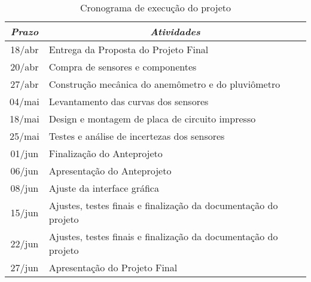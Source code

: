 \documentclass[12pt,a4paper]{instrumentacao}
\begin{document}
\begin{table}[H]
\centering
\caption{Cronograma de execução do projeto}
\label{tab:cronograma}
\begin{tabular}{|c|l|}
\hline
\textit{\textbf{Prazo}} & \multicolumn{1}{c|}{\textit{\textbf{Atividades}}}               \\ \hline
18/abr                  & Entrega da Proposta do Projeto Final                            \\ \hline
20/abr                  & Compra de sensores e componentes                                \\ \hline
27/abr                  & Construção mecânica do anemômetro e do pluviômetro              \\ \hline
04/mai                  & Levantamento das curvas dos sensores                            \\ \hline
18/mai                  & Design e montagem de placa de circuito impresso                 \\ \hline
25/mai                  & Testes e análise de incertezas dos sensores                     \\ \hline
01/jun                  & Finalização do Anteprojeto                                      \\ \hline
06/jun                  & Apresentação do Anteprojeto                                     \\ \hline
08/jun                  & Ajuste da interface gráfica                                     \\ \hline
15/jun                  & Ajustes, testes finais e finalização da documentação do projeto \\ \hline
22/jun                  & Ajustes, testes finais e finalização da documentação do projeto \\ \hline
27/jun                  & Apresentação do Projeto Final                                   \\ \hline
\end{tabular}
\end{table}
\end{document}
